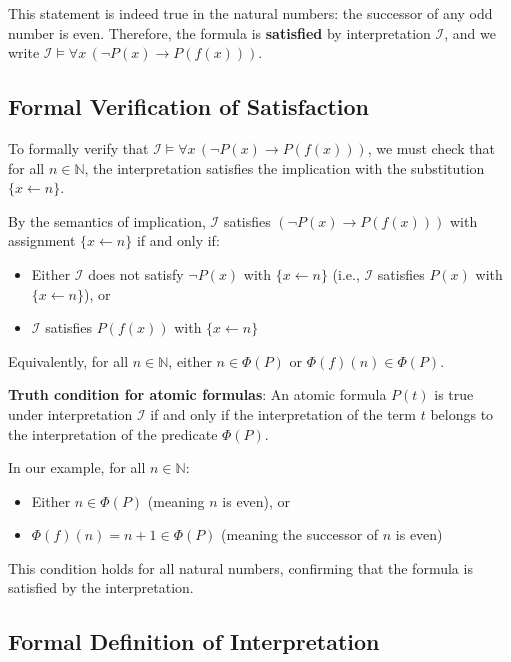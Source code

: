 \documentclass[11pt,a4paper]{article}
\theoremstyle{definition}
\theoremstyle{plain}
\theoremstyle{remark}
\newcommand{\N}{\mathbb{N}}
\begin{document}
This statement is indeed true in the natural numbers: the successor of any odd number is even. Therefore, the formula is \textbf{satisfied} by interpretation $\mathcal{I}$, and we write $\mathcal{I} \models \forall x \, (\neg P(x) \rightarrow P(f(x)))$.

\subsection{Formal Verification of Satisfaction}

To formally verify that $\mathcal{I} \models \forall x \, (\neg P(x) \rightarrow P(f(x)))$, we must check that for all $n \in \N$, the interpretation satisfies the implication with the substitution $\{x \leftarrow n\}$.

By the semantics of implication, $\mathcal{I}$ satisfies $(\neg P(x) \rightarrow P(f(x)))$ with assignment $\{x \leftarrow n\}$ if and only if:
\begin{itemize}
    \item Either $\mathcal{I}$ does not satisfy $\neg P(x)$ with $\{x \leftarrow n\}$ (i.e., $\mathcal{I}$ satisfies $P(x)$ with $\{x \leftarrow n\}$), or
    \item $\mathcal{I}$ satisfies $P(f(x))$ with $\{x \leftarrow n\}$
\end{itemize}

Equivalently, for all $n \in \N$, either $n \in \Phi(P)$ or $\Phi(f)(n) \in \Phi(P)$.

\textbf{Truth condition for atomic formulas}: An atomic formula $P(t)$ is true under interpretation $\mathcal{I}$ if and only if the interpretation of the term $t$ belongs to the interpretation of the predicate $\Phi(P)$.

In our example, for all $n \in \N$:
\begin{itemize}
    \item Either $n \in \Phi(P)$ (meaning $n$ is even), or
    \item $\Phi(f)(n) = n + 1 \in \Phi(P)$ (meaning the successor of $n$ is even)
\end{itemize}

This condition holds for all natural numbers, confirming that the formula is satisfied by the interpretation.

\subsection{Formal Definition of Interpretation}
\end{document}
